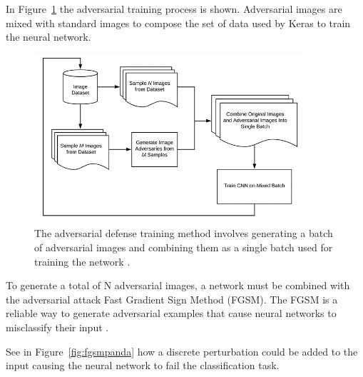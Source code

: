 \documentclass[12pt]{article}
\begin{document}
In Figure~\ref{fig:adv} the adversarial training process is shown. Adversarial images are mixed with standard images to compose the set of data used by Keras to train the neural network.

\begin{figure} [!ht] %
\begin{center}
\includegraphics[width=0.9\textwidth]{figures/advtraining.png}
\caption{ The adversarial defense training method involves generating a batch of adversarial images and combining them as a single batch used for training the network \parencite{Rosebrock}.}
\label{fig:adv}
\end{center}
\end{figure}

To generate a total of N adversarial images, a network must be combined with the adversarial attack Fast Gradient Sign Method (FGSM). The FGSM is a reliable way to generate adversarial examples that cause neural networks to misclassify their input \parencite{Goodfellow}.

See in Figure~\ref{fig:fgsmpanda} how a discrete perturbation could be added to the input causing the neural network to fail the classification task.
\end{document}
